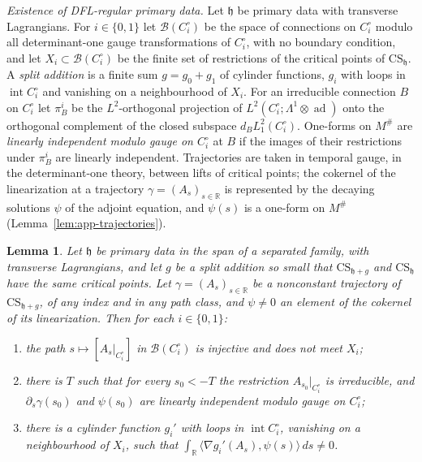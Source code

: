 \documentclass[11pt]{amsart}
\newtheorem{lemma}[theorem]{Lemma}
\theoremstyle{definition}
\theoremstyle{remark}
\theoremstyle{plain}
\numberwithin{equation}{section}
\newcommand{\RR}{\mathbb{R}}
\newcommand{\cB}{\mathcal{B}}
\newcommand{\ad}{\operatorname{ad}}
\begin{document}
\emph{Existence of DFL-regular primary data.} Let $\mathfrak h$ be primary data with transverse
Lagrangians. For $i\in\{0,1\}$ let $\cB(C_i^\circ)$ be the space of connections on $C_i^\circ$
modulo all determinant-one gauge transformations of $C_i^\circ$, with no boundary condition, and
let $X_i\subset\cB(C_i^\circ)$ be the finite set of restrictions of the critical points of
$\mathrm{CS}_{\mathfrak h}$. A \emph{split addition} is a finite sum $g=g_0+g_1$ of cylinder
functions, $g_i$ with loops in $\operatorname{int}C_i^\circ$ and vanishing on a neighbourhood of
$X_i$. For an irreducible connection $B$ on $C_i^\circ$ let $\pi^i_B$ be the $L^2$-orthogonal
projection of $L^2(C_i^\circ;\Lambda^1\otimes\ad)$ onto the orthogonal complement of the closed
subspace $d_BL^2_1(C_i^\circ)$. One-forms on $M^\#$ are \emph{linearly independent modulo gauge
on $C_i^\circ$} at $B$ if the images of their restrictions under $\pi^i_B$ are linearly
independent. Trajectories are taken in temporal gauge, in the determinant-one theory, between
lifts of critical points; the cokernel of the linearization at a trajectory $\gamma=(A_s)_{s\in\RR}$
is represented by the decaying solutions $\psi$ of the adjoint equation, and $\psi(s)$ is a
one-form on $M^\#$ (Lemma~\ref{lem:app-trajectories}).

\begin{lemma}\label{lem:dfl-detect}
Let $\mathfrak h$ be primary data in the span of a separated family, with transverse
Lagrangians, and let $g$ be a split addition so small that $\mathrm{CS}_{\mathfrak h+g}$ and
$\mathrm{CS}_{\mathfrak h}$ have the same critical points. Let $\gamma=(A_s)_{s\in\RR}$ be a
nonconstant trajectory of $\mathrm{CS}_{\mathfrak h+g}$, of any index and in any path class, and
$\psi\ne0$ an element of the cokernel of its linearization. Then for each $i\in\{0,1\}$:
\begin{enumerate}[label=(\roman*)]
\item the path $s\mapsto[A_s|_{C_i^\circ}]$ in $\cB(C_i^\circ)$ is injective and does not meet
  $X_i$;
\item there is $T$ such that for every $s_0<-T$ the restriction $A_{s_0}|_{C_i^\circ}$ is
  irreducible, and $\partial_s\gamma(s_0)$ and $\psi(s_0)$ are linearly independent modulo gauge
  on $C_i^\circ$;
\item there is a cylinder function $g_i'$ with loops in $\operatorname{int}C_i^\circ$, vanishing
  on a neighbourhood of $X_i$, such that
  $\int_\RR\langle\nabla g_i'(A_s),\psi(s)\rangle\,ds\ne0$.
\end{enumerate}
\end{lemma}
\end{document}
